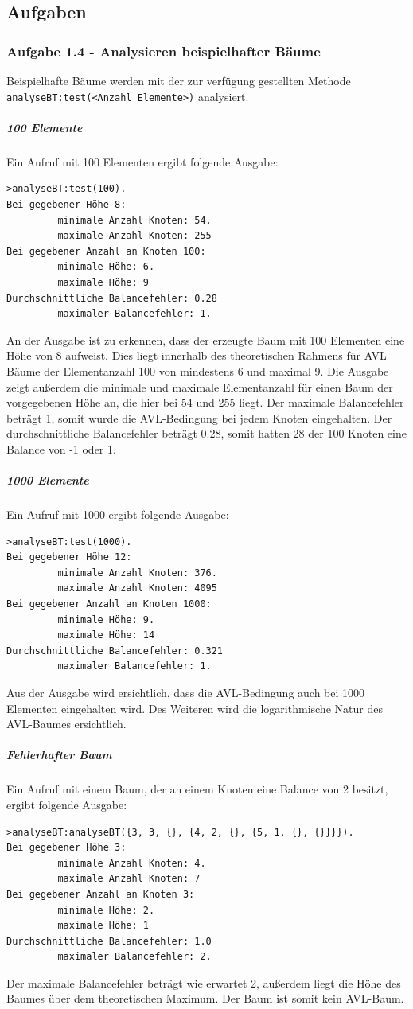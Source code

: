 \FloatBarrier

\subsection{Aufgaben}\label{subsec:aufgaben}

\subsubsection{Aufgabe 1.4 - Analysieren beispielhafter Bäume}
Beispielhafte Bäume werden mit der zur verfügung gestellten Methode\\
\verb|analyseBT:test(<Anzahl Elemente>)| analysiert.

\subparagraph{100 Elemente}
Ein Aufruf mit 100 Elementen ergibt folgende Ausgabe:
\begin{verbatim}
>analyseBT:test(100).
Bei gegebener Höhe 8:
         minimale Anzahl Knoten: 54.
         maximale Anzahl Knoten: 255
Bei gegebener Anzahl an Knoten 100:
         minimale Höhe: 6.
         maximale Höhe: 9
Durchschnittliche Balancefehler: 0.28
         maximaler Balancefehler: 1.
\end{verbatim}

An der Ausgabe ist zu erkennen, dass der erzeugte Baum mit 100 Elementen eine Höhe von 8
aufweist.
Dies liegt innerhalb des theoretischen Rahmens für AVL Bäume der Elementanzahl 100 von mindestens
6 und maximal 9.
Die Ausgabe zeigt außerdem die minimale und maximale Elementanzahl für einen Baum der
vorgegebenen Höhe an, die hier bei 54 und 255 liegt.
Der maximale Balancefehler beträgt 1, somit wurde die AVL-Bedingung bei jedem Knoten eingehalten.
Der durchschnittliche Balancefehler beträgt 0.28, somit hatten 28 der 100 Knoten eine Balance
von -1 oder 1.

\subparagraph{1000 Elemente}
Ein Aufruf mit 1000 ergibt folgende Ausgabe:
\begin{verbatim}
>analyseBT:test(1000).
Bei gegebener Höhe 12:
         minimale Anzahl Knoten: 376.
         maximale Anzahl Knoten: 4095
Bei gegebener Anzahl an Knoten 1000:
         minimale Höhe: 9.
         maximale Höhe: 14
Durchschnittliche Balancefehler: 0.321
         maximaler Balancefehler: 1.
\end{verbatim}

Aus der Ausgabe wird ersichtlich, dass die AVL-Bedingung auch bei 1000 Elementen eingehalten wird.
Des Weiteren wird die logarithmische Natur des AVL-Baumes ersichtlich.

\subparagraph{Fehlerhafter Baum}
Ein Aufruf mit einem Baum, der an einem Knoten eine Balance von 2 besitzt, ergibt folgende Ausgabe:
\begin{verbatim}
>analyseBT:analyseBT({3, 3, {}, {4, 2, {}, {5, 1, {}, {}}}}).
Bei gegebener Höhe 3:
         minimale Anzahl Knoten: 4.
         maximale Anzahl Knoten: 7
Bei gegebener Anzahl an Knoten 3:
         minimale Höhe: 2.
         maximale Höhe: 1
Durchschnittliche Balancefehler: 1.0
         maximaler Balancefehler: 2.
\end{verbatim}
Der maximale Balancefehler beträgt wie erwartet 2, außerdem liegt die Höhe des Baumes über dem
theoretischen Maximum.
Der Baum ist somit kein AVL-Baum.


